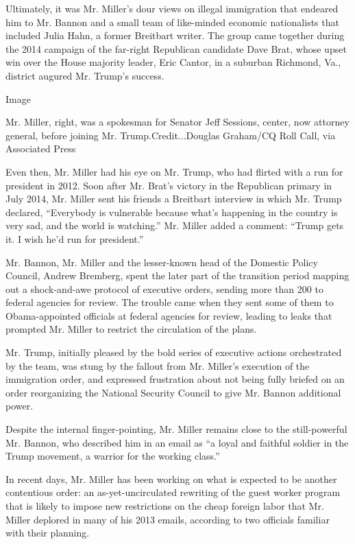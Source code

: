 Ultimately, it was Mr. Miller's dour views on illegal immigration that
endeared him to Mr. Bannon and a small team of like-minded economic
nationalists that included Julia Hahn, a former Breitbart writer. The
group came together during the 2014 campaign of the far-right Republican
candidate Dave Brat, whose upset win over the House majority leader,
Eric Cantor, in a suburban Richmond, Va., district augured Mr. Trump's
success.

Image

Mr. Miller, right, was a spokesman for Senator Jeff Sessions, center,
now attorney general, before joining Mr. Trump.Credit...Douglas
Graham/CQ Roll Call, via Associated Press

Even then, Mr. Miller had his eye on Mr. Trump, who had flirted with a
run for president in 2012. Soon after Mr. Brat's victory in the
Republican primary in July 2014, Mr. Miller sent his friends a Breitbart
interview in which Mr. Trump declared, ``Everybody is vulnerable because
what's happening in the country is very sad, and the world is
watching.'' Mr. Miller added a comment: ``Trump gets it. I wish he'd run
for president.''

Mr. Bannon, Mr. Miller and the lesser-known head of the Domestic Policy
Council, Andrew Bremberg, spent the later part of the transition period
mapping out a shock-and-awe protocol of executive orders, sending more
than 200 to federal agencies for review. The trouble came when they sent
some of them to Obama-appointed officials at federal agencies for
review, leading to leaks that prompted Mr. Miller to restrict the
circulation of the plans.

Mr. Trump, initially pleased by the bold series of executive actions
orchestrated by the team, was stung by the fallout from Mr. Miller's
execution of the immigration order, and expressed frustration about not
being fully briefed on an order reorganizing the National Security
Council to give Mr. Bannon additional power.

Despite the internal finger-pointing, Mr. Miller remains close to the
still-powerful Mr. Bannon, who described him in an email as ``a loyal
and faithful soldier in the Trump movement, a warrior for the working
class.''

In recent days, Mr. Miller has been working on what is expected to be
another contentious order: an as-yet-uncirculated rewriting of the guest
worker program that is likely to impose new restrictions on the cheap
foreign labor that Mr. Miller deplored in many of his 2013 emails,
according to two officials familiar with their planning.

